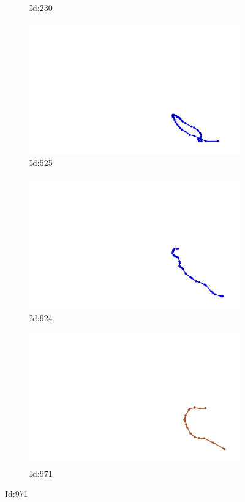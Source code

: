 \documentclass[12pt,twoside]{report}
\begin{document}
\begin{figure}
\begin{subfigure}[b]{0.20\textwidth}
\caption{Id:230}
\end{subfigure}
\begin{subfigure}[b]{0.20\textwidth}
\centering
\includegraphics[width=\textwidth]{../../trajectories/525.png}
\caption{Id:525}
\end{subfigure}
\begin{subfigure}[b]{0.20\textwidth}
\centering
\includegraphics[width=\textwidth]{../../trajectories/924.png}
\caption{Id:924}
\end{subfigure}
\begin{subfigure}[b]{0.20\textwidth}
\centering
\includegraphics[width=\textwidth]{../../trajectories/971.png}
\caption{Id:971}
\end{subfigure}
\end{figure}
\end{document}
